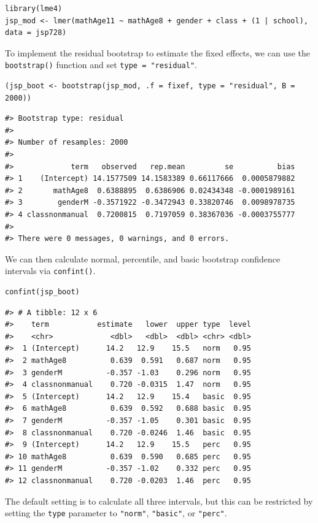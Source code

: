 \begin{verbatim}
library(lme4)
jsp_mod <- lmer(mathAge11 ~ mathAge8 + gender + class + (1 | school), data = jsp728)
\end{verbatim}

To implement the residual bootstrap to estimate the fixed effects, we can use the \texttt{bootstrap()} function and set \texttt{type\ =\ "residual"}.

\begin{verbatim}
(jsp_boot <- bootstrap(jsp_mod, .f = fixef, type = "residual", B = 2000))
\end{verbatim}

\begin{verbatim}
#> Bootstrap type: residual 
#> 
#> Number of resamples: 2000 
#> 
#>             term   observed   rep.mean         se          bias
#> 1    (Intercept) 14.1577509 14.1583389 0.66117666  0.0005879882
#> 2       mathAge8  0.6388895  0.6386906 0.02434348 -0.0001989161
#> 3        genderM -0.3571922 -0.3472943 0.33820746  0.0098978735
#> 4 classnonmanual  0.7200815  0.7197059 0.38367036 -0.0003755777
#> 
#> There were 0 messages, 0 warnings, and 0 errors.
\end{verbatim}

\noindent We can then calculate normal, percentile, and basic bootstrap confidence intervals via \texttt{confint()}.

\begin{verbatim}
confint(jsp_boot)
\end{verbatim}

\begin{verbatim}
#> # A tibble: 12 x 6
#>    term           estimate   lower  upper type  level
#>    <chr>             <dbl>   <dbl>  <dbl> <chr> <dbl>
#>  1 (Intercept)      14.2   12.9    15.5   norm   0.95
#>  2 mathAge8          0.639  0.591   0.687 norm   0.95
#>  3 genderM          -0.357 -1.03    0.296 norm   0.95
#>  4 classnonmanual    0.720 -0.0315  1.47  norm   0.95
#>  5 (Intercept)      14.2   12.9    15.4   basic  0.95
#>  6 mathAge8          0.639  0.592   0.688 basic  0.95
#>  7 genderM          -0.357 -1.05    0.301 basic  0.95
#>  8 classnonmanual    0.720 -0.0246  1.46  basic  0.95
#>  9 (Intercept)      14.2   12.9    15.5   perc   0.95
#> 10 mathAge8          0.639  0.590   0.685 perc   0.95
#> 11 genderM          -0.357 -1.02    0.332 perc   0.95
#> 12 classnonmanual    0.720 -0.0203  1.46  perc   0.95
\end{verbatim}

The default setting is to calculate all three intervals, but this can be restricted by setting the \texttt{type} parameter to \texttt{"norm"}, \texttt{"basic"}, or \texttt{"perc"}.


